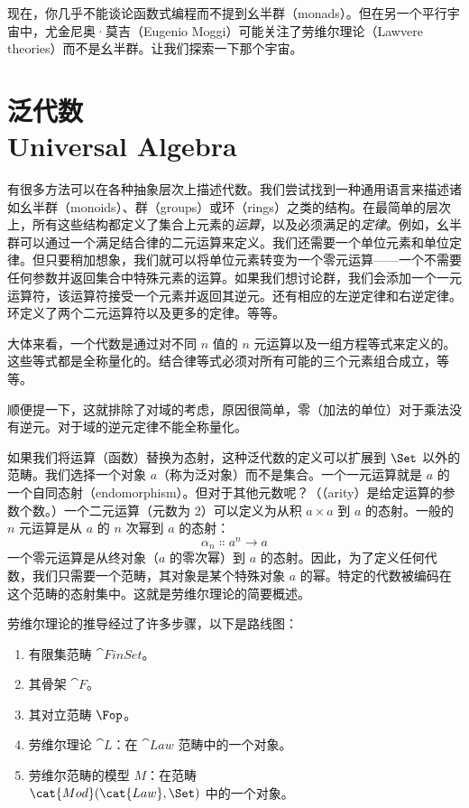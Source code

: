 
\lettrine[lhang=0.17]{现}{在，你几乎不能}谈论函数式编程而不提到幺半群（monads）。但在另一个平行宇宙中，尤金尼奥·莫吉（Eugenio Moggi）可能关注了劳维尔理论（Lawvere theories）而不是幺半群。让我们探索一下那个宇宙。

\section{泛代数\\ \textmd{Universal Algebra}}

有很多方法可以在各种抽象层次上描述代数。我们尝试找到一种通用语言来描述诸如幺半群（monoids）、群（groups）或环（rings）之类的结构。在最简单的层次上，所有这些结构都定义了集合上元素的\emph{运算}，以及必须满足的\emph{定律}。例如，幺半群可以通过一个满足结合律的二元运算来定义。我们还需要一个单位元素和单位定律。但只要稍加想象，我们就可以将单位元素转变为一个零元运算——一个不需要任何参数并返回集合中特殊元素的运算。如果我们想讨论群，我们会添加一个一元运算符，该运算符接受一个元素并返回其逆元。还有相应的左逆定律和右逆定律。环定义了两个二元运算符以及更多的定律。等等。

大体来看，一个代数是通过对不同 $n$ 值的 $n$ 元运算以及一组方程等式来定义的。这些等式都是全称量化的。结合律等式必须对所有可能的三个元素组合成立，等等。

顺便提一下，这就排除了对域的考虑，原因很简单，零（加法的单位）对于乘法没有逆元。对于域的逆元定律不能全称量化。

如果我们将运算（函数）替换为态射，这种泛代数的定义可以扩展到 $\Set$ 以外的范畴。我们选择一个对象 $a$（称为泛对象）而不是集合。一个一元运算就是 $a$ 的一个自同态射（endomorphism）。但对于其他元数呢？（（arity）是给定运算的参数个数。）一个二元运算（元数为 2）可以定义为从积 $a\times{}a$ 到 $a$ 的态射。一般的 $n$ 元运算是从 $a$ 的 $n$ 次幂到 $a$ 的态射：
\[\alpha_n \Colon a^n \to a\]
一个零元运算是从终对象（$a$ 的零次幂）到 $a$ 的态射。因此，为了定义任何代数，我们只需要一个范畴，其对象是某个特殊对象 $a$ 的幂。特定的代数被编码在这个范畴的态射集中。这就是劳维尔理论的简要概述。

劳维尔理论的推导经过了许多步骤，以下是路线图：

\begin{enumerate}
  \tightlist
  \item
  有限集范畴 $\cat{FinSet}$。
  \item
  其骨架 $\cat{F}$。
  \item
  其对立范畴 $\Fop$。
  \item
  劳维尔理论 $\cat{L}$：在 $\cat{Law}$ 范畴中的一个对象。
  \item
  劳维尔范畴的模型 $M$：在范畴\\
  $\cat{Mod}(\cat{Law}, \Set)$ 中的一个对象。
\end{enumerate}

